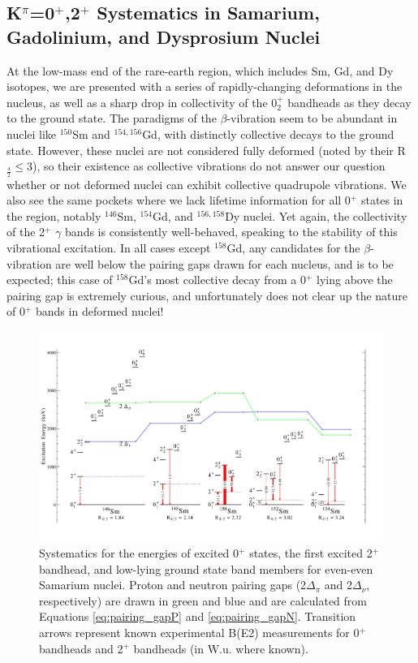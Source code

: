 \subsection{K$^\pi$=0$^+$,2$^+$ Systematics in Samarium, Gadolinium, and Dysprosium Nuclei}
At the low-mass end of the rare-earth region, which includes Sm, Gd, and Dy isotopes, we are presented with a series of rapidly-changing deformations in the nucleus, as well as a sharp drop in collectivity of the 0$^+_2$ bandheads as they decay to the ground state. The paradigms of the $\beta$-vibration seem to be abundant in nuclei like $^{150}$Sm and $^{154,156}$Gd, with distinctly collective decays to the ground state. However, these nuclei are not considered fully deformed (noted by their R$_\frac{4}{2}\leq$3), so their existence as collective vibrations do not answer our question whether or not deformed nuclei can exhibit collective quadrupole vibrations. We also see the same pockets where we lack lifetime information for all 0$^+$ states in the region, notably $^{146}$Sm, $^{154}$Gd, and $^{156,158}$Dy nuclei. Yet again, the collectivity of the 2$^+$ $\gamma$ bands is consistently well-behaved, speaking to the stability of this vibrational excitation. In all cases except $^{158}$Gd, any candidates for the $\beta$-vibration are well below the pairing gaps drawn for each nucleus, and is to be expected; this case of $^{158}$Gd's most collective decay from a 0$^+$ lying above the pairing gap is extremely curious, and unfortunately does not clear up the nature of 0$^+$ bands in deformed nuclei!

\begin{landscape}
\begin{figure}[ht] 
\begin{center}
\includegraphics[height=0.8\textheight]{figures/SciDraw_SmSystematics.pdf}
\caption{Systematics for the energies of excited 0$^+$ states, the first excited 2$^+$ bandhead, and low-lying ground state band members for even-even Samarium nuclei. Proton and neutron pairing gaps (2$\Delta_\pi$ and 2$\Delta_\nu$, respectively) are drawn in green and blue and are calculated from Equations \ref{eq:pairing_gapP} and \ref{eq:pairing_gapN}. Transition arrows represent known experimental B(E2) measurements for 0$^+$ bandheads and 2$^+$ bandheads (in W.u. where known). \label{fig:SmSystematics}}
\end{center}
\end{figure}
\end{landscape}


